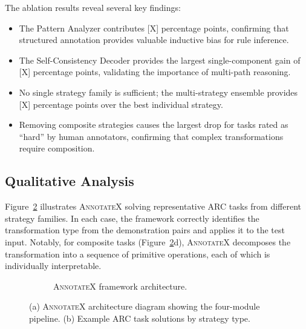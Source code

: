 \documentclass[conference,10pt,letterpaper]{IEEEtran}
\newcommand{\annotatexname}{\textsc{AnnotateX}}
\begin{document}
The ablation results reveal several key findings:
\begin{itemize}[leftmargin=*,nosep]
    \item The Pattern Analyzer contributes [X] percentage points, confirming that structured annotation provides valuable inductive bias for rule inference.
    \item The Self-Consistency Decoder provides the largest single-component gain of [X] percentage points, validating the importance of multi-path reasoning.
    \item No single strategy family is sufficient; the multi-strategy ensemble provides [X] percentage points over the best individual strategy.
    \item Removing composite strategies causes the largest drop for tasks rated as ``hard'' by human annotators, confirming that complex transformations require composition.
\end{itemize}

\subsection{Qualitative Analysis}

Figure~\ref{fig:examples} illustrates \annotatexname{} solving representative ARC tasks from different strategy families. In each case, the framework correctly identifies the transformation type from the demonstration pairs and applies it to the test input. Notably, for composite tasks (Figure~\ref{fig:examples}d), \annotatexname{} decomposes the transformation into a sequence of primitive operations, each of which is individually interpretable.

\begin{figure}[t]
\centering
\begin{subfigure}[b]{0.45\textwidth}
    \centering
    
    \caption{\annotatexname{} framework architecture.}
    \label{fig:arch}
\end{subfigure}
\vfill
\begin{subfigure}[b]{0.45\textwidth}
    \centering
\end{subfigure}
\caption{(a) \annotatexname{} architecture diagram showing the four-module pipeline. (b) Example ARC task solutions by strategy type.}
\label{fig:examples}
\end{figure}
\end{document}
